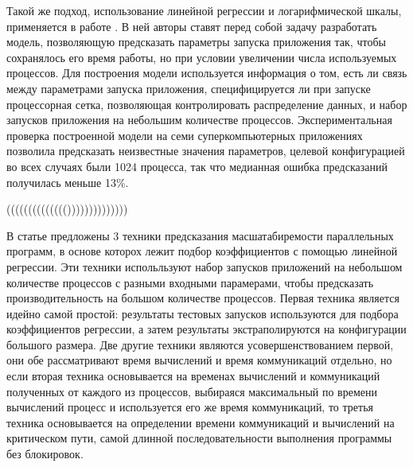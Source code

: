 Такой же подход, использование линейной регрессии и логарифмической шкалы, применяется в работе \cite{focused_regression}. В ней авторы ставят перед собой задачу разработать модель, позволяющую предсказать параметры запуска приложения так, чтобы сохранялось его время работы, но при условии увеличении числа используемых процессов. Для построения модели используется информация о том, есть ли связь между параметрами запуска приложения, специфицируется ли при запуске процессорная сетка, позволяющая контролировать распределение данных, и набор запусков приложения на небольшим количестве процессов. Экспериментальная проверка построенной модели на семи суперкомпьютерных приложениях позволила предсказать неизвестные значения параметров, целевой конфигурацией во всех случаях были 1024 процесса, так что медианная ошибка предсказаний получилась меньше 13\%.




(((((((((((((())))))))))))))

В статье \cite{log_main} предложены 3 техники предсказания масшатабиремости параллельных программ, в основе которох лежит подбор коэффициентов с помощью линейной регрессии. Эти техники испольльзуют набор запусков приложений на небольшом количестве процессов с разными входными парамерами, чтобы предсказать производительность на большом количестве процессов. Первая техника является идейно самой простой: результаты тестовых запусков используются для подбора коэффициентов регрессии, а затем результаты экстраполируются на конфигурации большого размера. Две другие техники являются усовершенствованием первой, они обе рассматривают время вычислений и время коммуникаций отдельно, но если вторая техника основывается на временах вычислений и коммуникаций полученных от каждого из процессов, выбираяся максимальный по времени вычислений процесс и используется его же время коммуникаций, то третья техника основывается на определении времени коммуникаций и вычислений на критическом пути, самой длинной последовательности выполнения программы без блокировок.


